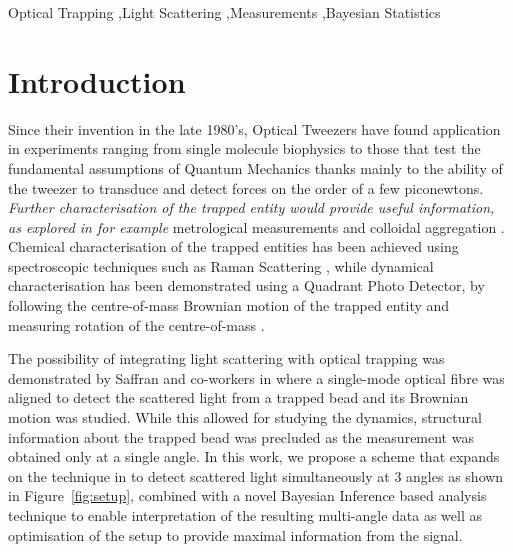 \documentclass[final, 3p]{elsarticle}
\begin{document}
\begin{frontmatter}
\begin{keyword}
	Optical Trapping \sep Light Scattering \sep Measurements \sep Bayesian Statistics 
\end{keyword}

\end{frontmatter}

\linenumbers


\section{Introduction}
\label{sec:Intro}

Since their invention in the late 1980's, Optical Tweezers have found application in experiments ranging from single molecule biophysics \cite{Bustamante2021Biophysics} to those that test the fundamental assumptions of Quantum Mechanics  \cite{yin2013large} thanks mainly to the ability of the tweezer to transduce and detect forces on the order of a few piconewtons. \textit{Further characterisation of the trapped entity would provide useful information, as explored in for example} metrological measurements \cite{arita2020coherent} and colloidal aggregation \cite{burns1990optical}. Chemical characterisation of the trapped entities has been achieved using spectroscopic techniques such as Raman Scattering \cite{gupta2014raman}, while dynamical characterisation has been demonstrated using a Quadrant Photo Detector,  by following the centre-of-mass Brownian motion of the trapped entity  \cite{friedrich2012tuning} and measuring rotation  of the centre-of-mass \cite{yifat2021facile}. 

The possibility of integrating light scattering with optical trapping
was demonstrated by Saffran and co-workers in \cite{Bar-Ziv_1998}
where a single-mode optical fibre was aligned to detect the scattered
light from a trapped bead and its Brownian motion was studied.  While
this allowed for studying the dynamics, structural information about
the trapped bead was precluded as the measurement was obtained only at
a single angle.  In this work, we propose a scheme that expands on the
technique in \cite{Bar-Ziv_1998} to detect scattered light
simultaneously at 3 angles as shown in Figure~\ref{fig:setup},
combined with a novel Bayesian Inference based analysis technique to
enable interpretation of the resulting multi-angle data as well as
optimisation of the setup to provide maximal information from the
signal.
\end{document}
